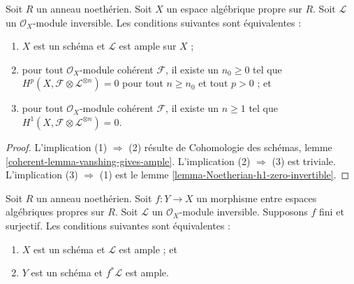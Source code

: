 \begin{lemma}
\label{lemma-vanshing-gives-ample}
Soit $R$ un anneau noethérien. Soit $X$ un espace algébrique propre
sur $R$. Soit $\mathcal{L}$ un $\mathcal{O}_X$-module inversible.
Les conditions suivantes sont équivalentes :
\begin{enumerate}
\item $X$ est un schéma et $\mathcal{L}$ est ample sur $X$ ;
\item pour tout $\mathcal{O}_X$-module cohérent $\mathcal{F}$, il existe
un $n_0 \geq 0$ tel que
$H^p(X, \mathcal{F} \otimes \mathcal{L}^{\otimes n}) = 0$ pour tout $n \geq n_0$
et tout $p > 0$ ; et
\item pour tout $\mathcal{O}_X$-module cohérent $\mathcal{F}$, il existe
un $n \geq 1$ tel que
$H^1(X, \mathcal{F} \otimes \mathcal{L}^{\otimes n}) = 0$.
\end{enumerate}
\end{lemma}

\begin{proof}
L'implication (1) $\Rightarrow$ (2) résulte de
Cohomologie des schémas, lemme \ref{coherent-lemma-vanshing-gives-ample}.
L'implication (2) $\Rightarrow$ (3) est triviale.
L'implication (3) $\Rightarrow$ (1) est le
lemme \ref{lemma-Noetherian-h1-zero-invertible}.
\end{proof}

\begin{lemma}
\label{lemma-surjective-finite-morphism-ample}
Soit $R$ un anneau noethérien. Soit $f : Y \to X$ un morphisme entre espaces
algébriques propres sur $R$. Soit $\mathcal{L}$ un
$\mathcal{O}_X$-module inversible. Supposons $f$ fini et surjectif.
Les conditions suivantes sont équivalentes :
\begin{enumerate}
\item $X$ est un schéma et $\mathcal{L}$ est ample ; et
\item $Y$ est un schéma et $f^*\mathcal{L}$ est ample.
\end{enumerate}
\end{lemma}

